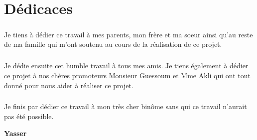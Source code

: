 \chapter*{Dédicaces}    

\vspace{1.5cm}

\paragraph{}
Je tiens à dédier ce travail à mes parents, mon frère et ma soeur ainsi qu’au reste de ma famille qui m’ont soutenu au cours de la réalisation de ce projet.
\paragraph{}
Je dédie ensuite cet humble travail à tous mes amis. Je tiens également à dédier ce projet à nos chères promoteurs Monsieur Guessoum et Mme Akli qui ont tout donné pour nous aider à réaliser ce projet.
\paragraph{}
Je finis par dédier ce travail à mon très cher binôme sans qui ce travail n’aurait pas été possible.

\vspace{0.5cm}
\begin{center}
	\Large
	\hspace{12.5cm}
	\textbf{Yasser}
\end{center}